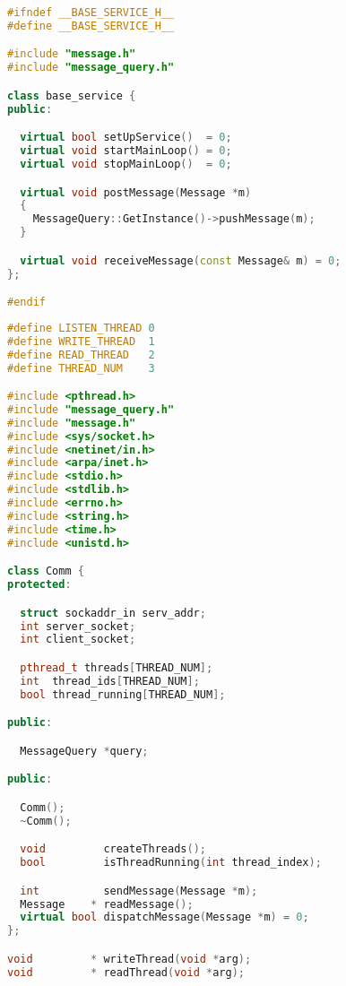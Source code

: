 \begin{lstlisting}[caption=basic-service.h,language=C++]
#ifndef __BASE_SERVICE_H__
#define __BASE_SERVICE_H__

#include "message.h"
#include "message_query.h"

class base_service {
public:

  virtual bool setUpService()  = 0;
  virtual void startMainLoop() = 0;
  virtual void stopMainLoop()  = 0;

  virtual void postMessage(Message *m)
  {
    MessageQuery::GetInstance()->pushMessage(m);
  }

  virtual void receiveMessage(const Message& m) = 0;
};

#endif
\end{lstlisting}





\begin{lstlisting}[caption=comm.h,language=C++]
#define LISTEN_THREAD 0
#define WRITE_THREAD  1
#define READ_THREAD   2
#define THREAD_NUM    3

#include <pthread.h>
#include "message_query.h"
#include "message.h"
#include <sys/socket.h>
#include <netinet/in.h>
#include <arpa/inet.h>
#include <stdio.h>
#include <stdlib.h>
#include <errno.h>
#include <string.h>
#include <time.h>
#include <unistd.h>

class Comm {
protected:

  struct sockaddr_in serv_addr;
  int server_socket;
  int client_socket;

  pthread_t threads[THREAD_NUM];
  int  thread_ids[THREAD_NUM];
  bool thread_running[THREAD_NUM];

public:

  MessageQuery *query;

public:

  Comm();
  ~Comm();

  void         createThreads();
  bool         isThreadRunning(int thread_index);

  int          sendMessage(Message *m);
  Message    * readMessage();
  virtual bool dispatchMessage(Message *m) = 0;
};

void         * writeThread(void *arg);
void         * readThread(void *arg);

\end{lstlisting}







